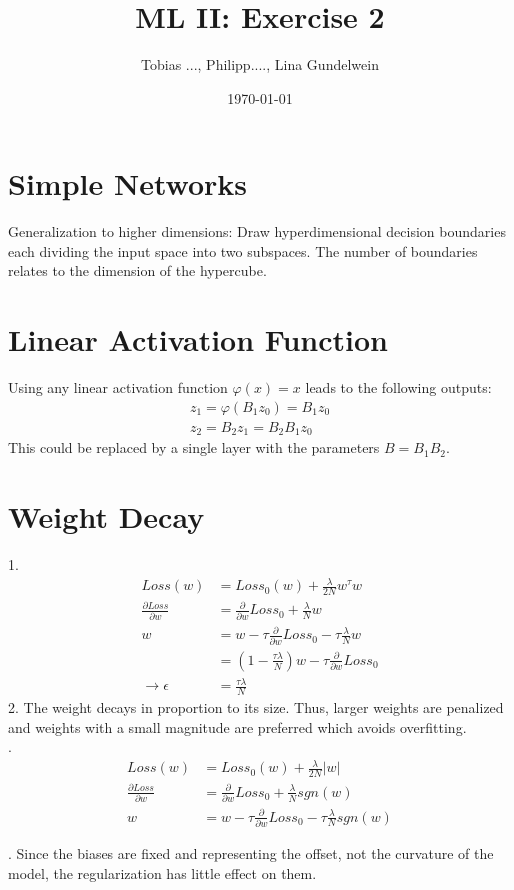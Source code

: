 \documentclass{article}
\title{ML II:  Exercise 2} %
\author{Tobias ..., Philipp...., Lina Gundelwein} %
\date{\today} %
\begin{document}
\maketitle 
\section*{Simple Networks}
\begin{figure}[htb]
\def\svgwidth{\textwidth}
 
\end{figure}

\begin{figure}[htb!]
\def\svgwidth{\textwidth}
 
\end{figure}
Generalization to higher dimensions: Draw hyperdimensional decision boundaries each dividing the input space into two subspaces. The number of boundaries relates to the dimension of the hypercube. 
\newpage

\section*{Linear Activation Function}
Using any linear activation function $\varphi(x) = x$ leads to the following outputs:
\begin{align*}
z_1 = \varphi(B_1 z_0) = B_1z_0\\
z_2 = B_2z_1 = B_2B_1z_0
\end{align*}
This could be replaced by a single layer with the parameters $B = B_1B_2$.

\section*{Weight Decay}
1. \begin{align*}
Loss(w) &= Loss_0(w)+\frac{\lambda}{2N}w^{\tau}w\\
\frac{\partial Loss}{\partial w} &= \frac{\partial}{\partial w} Loss_0 + \frac{\lambda}{N}w\\
w &= w-\tau \frac{\partial}{\partial w}Loss_0 - \tau \frac{\lambda}{N}w \\
&= (1-\frac{\tau\lambda}{N})w -\tau \frac{\partial}{\partial w}Loss_0\\
\rightarrow \epsilon &= \frac{\tau\lambda}{N}
\end{align*}
2. The weight decays in proportion to its size. Thus, larger weights are penalized and weights with a small magnitude are preferred which avoids overfitting. \\

. \begin{align*}
Loss(w) &= Loss_0(w)+\frac{\lambda}{2N}|w|\\
\frac{\partial Loss}{\partial w}& = \frac{\partial}{\partial w} Loss_0 + \frac{\lambda}{N}sgn(w)\\
w &= w-\tau \frac{\partial}{\partial w}Loss_0 - \tau \frac{\lambda}{N}sgn(w) 
\end{align*}

. Since the biases are fixed and representing the offset, not the curvature of the model, the regularization has little effect on them.
\end{document}
